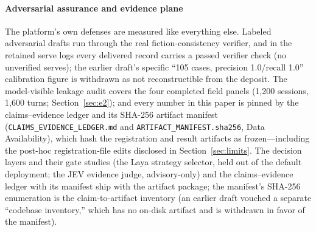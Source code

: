 \paragraph{Adversarial assurance and evidence plane}
The platform's own defenses are measured like everything else. Labeled
adversarial drafts run through the real fiction-consistency verifier, and
in the retained serve logs every delivered record carries a passed
verifier check (no unverified serves); the earlier draft's specific
``105 cases, precision 1.0/recall 1.0'' calibration figure is withdrawn
as not reconstructible from the deposit. The
model-visible leakage audit covers the four completed field panels
(1{,}200 sessions, 1{,}600 turns; Section~\ref{sec:e2}); and every number
in this paper is
pinned by the claims--evidence ledger and its SHA-256 artifact manifest
(\texttt{CLAIMS\_EVIDENCE\_LEDGER.md} and
\texttt{ARTIFACT\_MANIFEST.sha256}, Data Availability), which hash the
registration and result artifacts as frozen---including the post-hoc
registration-file edits disclosed in Section~\ref{sec:limits}.
The decision layers and their gate studies (the Laya strategy selector,
held out of the default deployment; the JEV evidence judge, advisory-only)
and the claims--evidence ledger with its
manifest ship with the artifact package; the manifest's SHA-256
enumeration is the claim-to-artifact inventory (an earlier draft vouched a
separate ``codebase inventory,'' which has no on-disk artifact and is
withdrawn in favor of the manifest).

